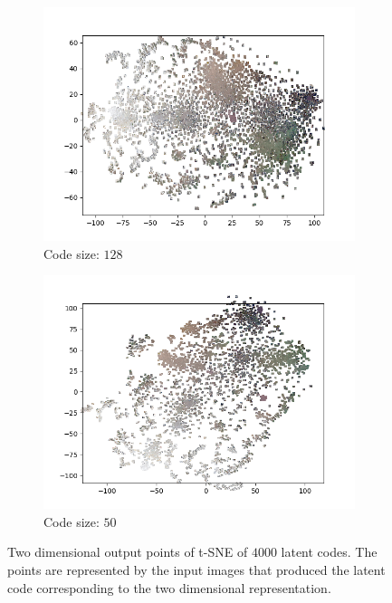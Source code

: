 \begin{figure}[H]
\begin{subfigure}{.5\textwidth}
        \centering
        \includegraphics[width=\textwidth]{images/figures/experiments_latent/convolutional_dim128_images.png}   
        \caption{Code size: $128$}
    \end{subfigure}%
    \begin{subfigure}{.5\textwidth}
        \centering
        \includegraphics[width=\textwidth]{images/figures/experiments_latent/convolutional_dim50_images.png}
        \caption{Code size: $50$}
    \end{subfigure}
    \caption{Two dimensional output points of t-SNE of $4000$ latent codes. The points are represented by the input
    images that produced the latent code corresponding to the two dimensional representation.} 
    \label{figure_images_convolutional_tsne}
\end{figure} 

